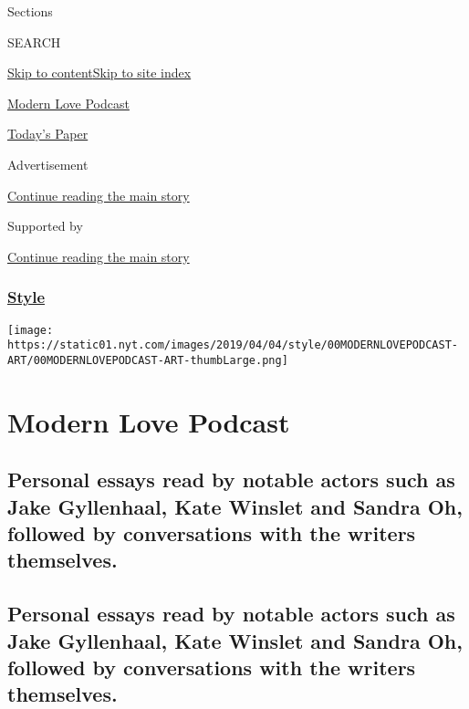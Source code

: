 Sections

SEARCH

\protect\hyperlink{site-content}{Skip to
content}\protect\hyperlink{site-index}{Skip to site index}

\href{https://www.nytimes.com/column/modern-love-podcast}{Modern Love
Podcast}

\href{https://myaccount.nytimes.com/auth/login?response_type=cookie\&client_id=vi}{}

\href{https://www.nytimes.com/section/todayspaper}{Today's Paper}

Advertisement

\protect\hyperlink{after-top}{Continue reading the main story}

Supported by

\protect\hyperlink{after-sponsor}{Continue reading the main story}

\hypertarget{style}{%
\subsubsection{\texorpdfstring{\href{/section/style}{Style}}{Style}}\label{style}}

\texttt{[image: https://static01.nyt.com/images/2019/04/04/style/00MODERNLOVEPODCAST-ART/00MODERNLOVEPODCAST-ART-thumbLarge.png]}

\hypertarget{modern-love-podcast}{%
\section{Modern Love Podcast}\label{modern-love-podcast}}

\hypertarget{personal-essays-read-by-notable-actors-such-as-jake-gyllenhaal-kate-winslet-and-sandra-oh-followed-by-conversations-with-the-writers-themselves}{%
\subsection{Personal essays read by notable actors such as Jake
Gyllenhaal, Kate Winslet and Sandra Oh, followed by conversations with
the writers
themselves.}\label{personal-essays-read-by-notable-actors-such-as-jake-gyllenhaal-kate-winslet-and-sandra-oh-followed-by-conversations-with-the-writers-themselves}}

\hypertarget{personal-essays-read-by-notable-actors-such-as-jake-gyllenhaal-kate-winslet-and-sandra-oh-followed-by-conversations-with-the-writers-themselves-1}{%
\subsection{Personal essays read by notable actors such as Jake
Gyllenhaal, Kate Winslet and Sandra Oh, followed by conversations with
the writers
themselves.}\label{personal-essays-read-by-notable-actors-such-as-jake-gyllenhaal-kate-winslet-and-sandra-oh-followed-by-conversations-with-the-writers-themselves-1}}

